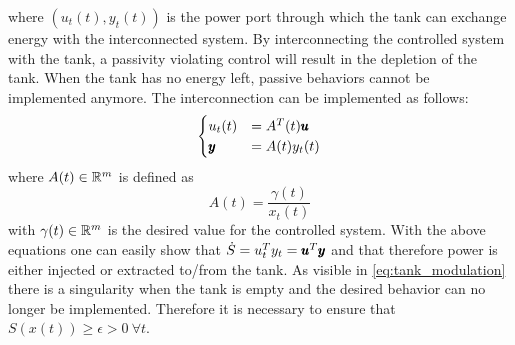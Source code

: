 where $(u_t(t), y_t(t))$ is the power port through which the tank can exchange energy with the interconnected system. By interconnecting the controlled system with the tank, a passivity violating control will result in the depletion of the tank. When the tank has no energy left, passive behaviors cannot be implemented anymore. The interconnection can be implemented as follows:
\begin{equation}
\begin{cases}
    u_t(t) &= A^T(t) \pmb{u} \\
    \pmb{y} &= A(t) y_t(t)
\end{cases}
\end{equation}
where $A(t) \in \mathbb{R}^{m}$ is defined as
\begin{equation} \label{eq:tank_modulation}
    A(t) = \frac{\gamma(t)}{x_t(t)}
\end{equation}
with $\gamma(t) \in \mathbb{R}^{m}$ is the desired value for the controlled system. With the above equations one can easily show that $\dot{S} = u_t^T y_t = \pmb{u}^T \pmb{y}$ and that therefore power is either injected or extracted to/from the tank. As visible in \eqn \ref{eq:tank_modulation} there is a singularity when the tank is empty and the desired behavior can no longer be implemented. Therefore it is necessary to ensure that $S(x(t)) \geq \epsilon > 0 \ \forall t$.